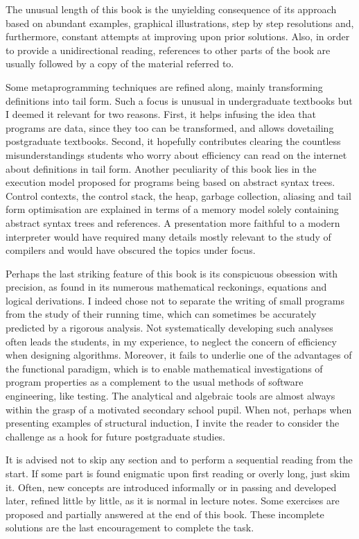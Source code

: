 The unusual length of this book is the unyielding consequence of its
approach based on abundant examples, graphical illustrations, step by
step resolutions and, furthermore, constant attempts at improving upon
prior solutions. Also, in order to provide a unidirectional reading,
references to other parts of the book are usually followed by a copy
of the material referred to.

Some metaprogramming techniques are refined along, mainly transforming
definitions into tail form. Such a focus is unusual in undergraduate
textbooks but I deemed it relevant for two reasons. First, it helps
infusing the idea that programs are data, since they too can be
transformed, and allows dovetailing postgraduate textbooks. Second, it
hopefully contributes clearing the countless misunderstandings
students who worry about efficiency can read on the internet about
definitions in tail form. Another peculiarity of this book lies in the
execution model proposed for \Erlang programs being based on abstract
syntax trees. Control contexts, the control stack, the heap, garbage
collection, aliasing and tail form optimisation are explained in terms
of a memory model solely containing abstract syntax trees and
references. A presentation more faithful to a modern interpreter would
have required many details mostly relevant to the study of compilers
and would have obscured the topics under focus.

Perhaps the last striking feature of this book is its conspicuous
obsession with precision, as found in its numerous mathematical
reckonings, equations and logical derivations. I indeed chose not to
separate the writing of small programs from the study of their running
time, which can sometimes be accurately predicted by a rigorous
analysis. Not systematically developing such analyses often leads the
students, in my experience, to neglect the concern of efficiency when
designing algorithms. Moreover, it fails to underlie one of the
advantages of the functional paradigm, which is to enable mathematical
investigations of program properties as a complement to the usual
methods of software engineering, like testing. The analytical and
algebraic tools are almost always within the grasp of a motivated
secondary school pupil. When not, perhaps when presenting examples of
structural induction, I invite the reader to consider the challenge as
a hook for future postgraduate studies.

It is advised not to skip any section and to perform a sequential
reading from the start. If some part is found enigmatic upon first
reading or overly long, just skim it. Often, new concepts are
introduced informally or in passing and developed later, refined
little by little, as it is normal in lecture notes. Some exercises are
proposed and partially answered at the end of this book. These
incomplete solutions are the last encouragement to complete the task.

